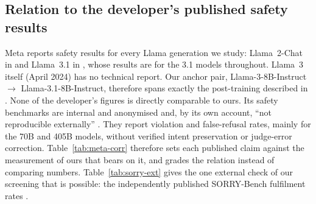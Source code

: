 \subsection{Relation to the developer's published safety results}
\label{sec:disc-meta}

Meta reports safety results for every Llama generation we study: Llama~2-Chat in \citet{touvron2023llama2} and
Llama~3.1 in \citet{dubey2024llama3}, whose results are for the 3.1 models throughout. Llama~3 itself (April 2024)
has no technical report. Our anchor pair, Llama-3-8B-Instruct $\rightarrow$ Llama-3.1-8B-Instruct, therefore spans
exactly the post-training described in \citet[\S5.4.3]{dubey2024llama3}. None of the developer's figures is
directly comparable to ours. Its safety benchmarks are internal and anonymised and, by its own account, ``not
reproducible externally'' \citep[fn.~13]{dubey2024llama3}. They report violation and false-refusal rates, mainly for
the 70B and 405B models, without verified intent preservation or judge-error correction. Table~\ref{tab:meta-corr}
therefore sets each published claim against the measurement of ours that bears on it, and grades the relation instead
of comparing numbers. Table~\ref{tab:sorry-ext} gives the one external check of our screening that is possible: the
independently published SORRY-Bench fulfilment rates \citep{xie2025sorrybench}.


